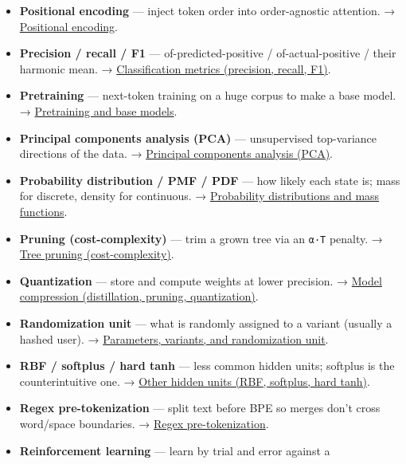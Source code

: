 \documentclass[
  10pt,
  letterpaper,
  onecolumn]{article}
\begin{document}
\begin{itemize}
  \protect\hyperlink{pooling}{Pooling}.
\item
  \textbf{Positional encoding} --- inject token order into
  order-agnostic attention. →
  \protect\hyperlink{positional-encoding}{Positional encoding}.
\item
  \textbf{Precision / recall / F1} --- of-predicted-positive /
  of-actual-positive / their harmonic mean. →
  \protect\hyperlink{classification-metrics-precision-recall-f1}{Classification
  metrics (precision, recall, F1)}.
\item
  \textbf{Pretraining} --- next-token training on a huge corpus to make
  a base model. →
  \protect\hyperlink{pretraining-and-base-models}{Pretraining and base
  models}.
\item
  \textbf{Principal components analysis (PCA)} --- unsupervised
  top-variance directions of the data. →
  \protect\hyperlink{principal-components-analysis-pca}{Principal
  components analysis (PCA)}.
\item
  \textbf{Probability distribution / PMF / PDF} --- how likely each
  state is; mass for discrete, density for continuous. →
  \protect\hyperlink{probability-distributions-and-mass-functions}{Probability
  distributions and mass functions}.
\item
  \textbf{Pruning (cost-complexity)} --- trim a grown tree via an
  \texttt{α·\textbar{}T\textbar{}} penalty. →
  \protect\hyperlink{tree-pruning-cost-complexity}{Tree pruning
  (cost-complexity)}.
\item
  \textbf{Quantization} --- store and compute weights at lower
  precision. →
  \protect\hyperlink{model-compression-distillation-pruning-quantization}{Model
  compression (distillation, pruning, quantization)}.
\item
  \textbf{Randomization unit} --- what is randomly assigned to a variant
  (usually a hashed user). →
  \protect\hyperlink{parameters-variants-and-randomization-unit}{Parameters,
  variants, and randomization unit}.
\item
  \textbf{RBF / softplus / hard tanh} --- less common hidden units;
  softplus is the counterintuitive one. →
  \protect\hyperlink{other-hidden-units-rbf-softplus-hard-tanh}{Other
  hidden units (RBF, softplus, hard tanh)}.
\item
  \textbf{Regex pre-tokenization} --- split text before BPE so merges
  don't cross word/space boundaries. →
  \protect\hyperlink{regex-pre-tokenization}{Regex pre-tokenization}.
\item
  \textbf{Reinforcement learning} --- learn by trial and error against a

\end{itemize}
\end{document}
